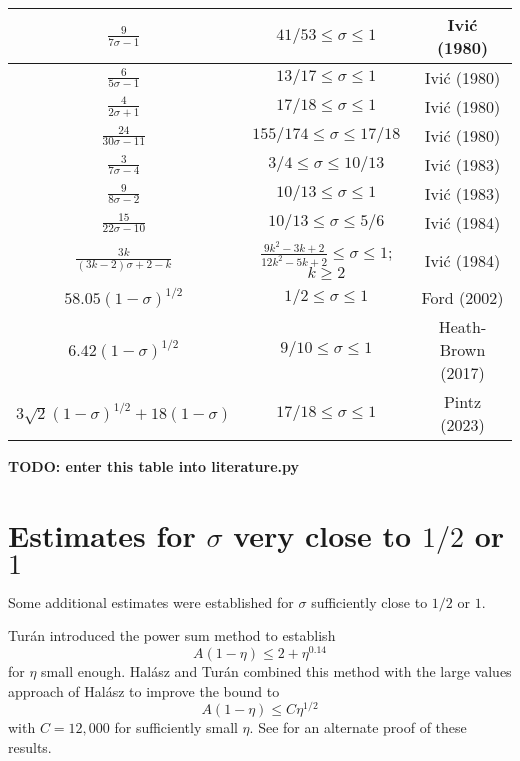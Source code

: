 \begin{table}[ht]
\begin{tabular}{|c|c|c|}
    \hline
    $\frac{9}{7\sigma-1}$ & $41/53 \leq \sigma \leq 1$ & Ivi\'c (1980) \cite{ivic_exponent_pairs} \\
    \hline
    $\frac{6}{5\sigma-1}$ & $13/17 \leq \sigma \leq 1$ & Ivi\'c (1980) \cite{ivic_exponent_pairs} \\
    \hline
    $\frac{4}{2\sigma+1}$ & $17/18 \leq \sigma \leq 1$ & Ivi\'c (1980) \cite{ivic_exponent_pairs} \\
    \hline
    $\frac{24}{30\sigma-11}$ & $155/174 \leq \sigma \leq 17/18$ & Ivi\'c (1980) \cite{ivic_exponent_pairs} \\
    \hline
    $\frac{3}{7\sigma-4}$ & $3/4 \leq \sigma \leq 10/13$ & Ivi\'c (1983) \cite{ivic_topics_1983} \\
    \hline
    $\frac{9}{8\sigma-2}$ & $10/13 \leq \sigma \leq 1$ & Ivi\'c (1983) \cite{ivic_topics_1983} \\
    \hline
    $\frac{15}{22\sigma-10}$ & $10/13 \leq \sigma \leq 5/6$ & Ivi\'c (1984) \cite{ivic_zero_1984} \\
    \hline
    $\frac{3k}{(3k-2)\sigma+2-k}$ & $\frac{9k^2 -3k + 2}{12k^2 -5k + 2} \leq \sigma \leq 1$; $k \geq 2$ & Ivi\'c (1984) \cite{ivic_zero_1984} \\
    \hline
    $58.05 (1-\sigma)^{1/2}$ & $1/2 \leq \sigma \leq 1$ & Ford (2002) \cite{FordZeta} \\
    \hline
    $6.42 (1-\sigma)^{1/2}$ & $9/10 \leq \sigma \leq 1$ & Heath-Brown (2017) \cite{heathbrown_new_2017} \\
    \hline
    $3\sqrt{2}(1-\sigma)^{1/2}+18(1-\sigma)$ & $17/18 \leq \sigma \leq 1$ & Pintz (2023) \cite{pintz_density_2023}\\
    \hline
    \end{tabular}
    \label{zero_density_historical}
    \end{table}

{\bf TODO: enter this table into literature.py}

\section{Estimates for \texorpdfstring{$\sigma$}{sigma} very close to \texorpdfstring{$1/2$}{1/2} or \texorpdfstring{$1$}{1}}

Some additional estimates were established for $\sigma$ sufficiently close to $1/2$ or $1$.

Tur\'an \cite{turan} introduced the power sum method to establish
$$ A(1-\eta) \leq 2 + \eta^{0.14}$$
for $\eta$ small enough. Hal\'asz and Tur\'an \cite{halasz_distribution_1969} combined this method with the large values approach of Hal\'asz \cite{halasz_1968} to improve the bound to
\begin{equation}\label{a-eta}
  A(1-\eta) \leq C \eta^{1/2}
\end{equation}
with $C = 12,000$ for sufficiently small $\eta$.  See \cite{pintz_2022} for an alternate proof of these results.

